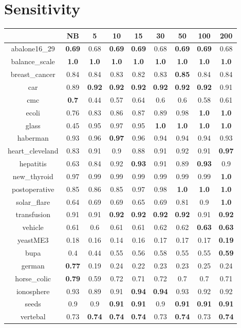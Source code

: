 \documentclass{article}%
\begin{document}
%
\section*{Sensitivity}%
\begin{tabular}{c|cccccccc}%
\hline%
&NB&5&10&15&30&50&100&200\\%
\hline%
abalone16\_29&\textbf{0.69}&0.68&\textbf{0.69}&\textbf{0.69}&0.68&\textbf{0.69}&\textbf{0.69}&0.68\\%
\hline%
balance\_scale&\textbf{1.0}&\textbf{1.0}&\textbf{1.0}&\textbf{1.0}&\textbf{1.0}&\textbf{1.0}&\textbf{1.0}&\textbf{1.0}\\%
\hline%
breast\_cancer&0.84&0.84&0.83&0.82&0.83&\textbf{0.85}&0.84&0.84\\%
\hline%
car&0.89&\textbf{0.92}&\textbf{0.92}&\textbf{0.92}&\textbf{0.92}&\textbf{0.92}&\textbf{0.92}&0.91\\%
\hline%
cmc&\textbf{0.7}&0.44&0.57&0.64&0.6&0.6&0.58&0.61\\%
\hline%
ecoli&0.76&0.83&0.86&0.87&0.89&0.98&\textbf{1.0}&\textbf{1.0}\\%
\hline%
glass&0.45&0.95&0.97&0.95&\textbf{1.0}&\textbf{1.0}&\textbf{1.0}&\textbf{1.0}\\%
\hline%
haberman&0.93&0.96&\textbf{0.97}&0.96&0.94&0.94&0.94&0.93\\%
\hline%
heart\_cleveland&0.83&0.91&0.9&0.88&0.91&0.92&0.91&\textbf{0.97}\\%
\hline%
hepatitis&0.63&0.84&0.92&\textbf{0.93}&0.91&0.89&\textbf{0.93}&0.9\\%
\hline%
new\_thyroid&0.97&0.99&0.99&0.99&0.99&0.99&0.99&\textbf{1.0}\\%
\hline%
postoperative&0.85&0.86&0.85&0.97&0.98&\textbf{1.0}&\textbf{1.0}&\textbf{1.0}\\%
\hline%
solar\_flare&0.64&0.69&0.69&0.65&0.69&0.81&0.9&\textbf{1.0}\\%
\hline%
transfusion&0.91&0.91&\textbf{0.92}&\textbf{0.92}&\textbf{0.92}&\textbf{0.92}&0.91&\textbf{0.92}\\%
\hline%
vehicle&0.61&0.6&0.61&0.61&0.62&0.62&\textbf{0.63}&\textbf{0.63}\\%
\hline%
yeastME3&0.18&0.16&0.14&0.16&0.17&0.17&0.17&\textbf{0.19}\\%
\hline%
bupa&0.4&0.44&0.55&0.56&0.58&0.55&0.55&\textbf{0.59}\\%
\hline%
german&\textbf{0.77}&0.19&0.24&0.22&0.23&0.23&0.25&0.24\\%
\hline%
horse\_colic&\textbf{0.79}&0.59&0.72&0.71&0.72&0.7&0.7&0.71\\%
\hline%
ionosphere&0.93&0.89&0.91&\textbf{0.94}&\textbf{0.94}&0.93&0.92&0.92\\%
\hline%
seeds&0.9&0.9&\textbf{0.91}&\textbf{0.91}&0.9&\textbf{0.91}&\textbf{0.91}&\textbf{0.91}\\%
\hline%
vertebal&0.73&\textbf{0.74}&\textbf{0.74}&\textbf{0.74}&0.73&\textbf{0.74}&0.73&\textbf{0.74}\\%
\hline%
\end{tabular}
\end{document}
